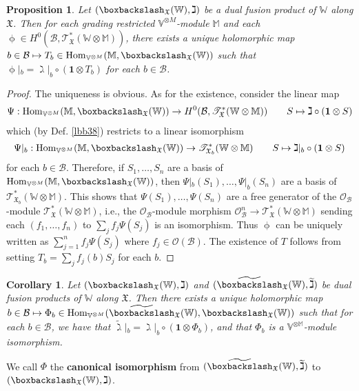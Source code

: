 \documentclass[11pt,b5paper,notitlepage]{article}
\theoremstyle{definition}
\theoremstyle{plain}
\newtheorem{pp}[df]{Proposition}
\newtheorem{co}[df]{Corollary}
\newcommand{\mc}{\mathcal}
\newcommand{\wtd}{\widetilde}
\newcommand{\idt}{\mathbf{1}}
\newcommand{\Hom}{\mathrm{Hom}}
\newcommand{\scr}{\mathscr}
\newcommand{\Vbb}{\mathbb V}
\newcommand{\Wbb}{\mathbb W}
\newcommand{\Mbb}{\mathbb M}
\newcommand{\<}{\left\langle}
\renewcommand{\>}{\right\rangle}
\newcommand{\MO}{\mathcal{O}}
\newcommand{\MB}{\mathcal{B}}
\newcommand{\fx}{\mathfrak{X}}
\newcommand{\bbs}{\boxbackslash}
\numberwithin{equation}{subsection}
\begin{document}
\begin{pp}\label{lbb39}
Let $(\bbs_\fx(\Wbb),\gimel)$ be a dual fusion product of $\Wbb$ along $\fx$. Then for each grading restricted $\Vbb^{\otimes M}$-module $\Mbb$ and each $\upphi\in H^0(\MB,\scr T_\fx^*(\Wbb\otimes\Mbb))$, there exists a unique holomorphic map $b\in\MB\mapsto T_b\in \Hom_{\Vbb^{\otimes M}}(\Mbb,\bbs_\fx(\Wbb))$ such that $\upphi|_b=\gimel|_b\circ(\idt\otimes T_b)$ for each $b\in\MB$.
\end{pp}


\begin{proof}
The uniqueness is obvious. As for the existence, consider the linear map
\begin{align*}
\Psi:\Hom_{\Vbb^{\otimes M}}(\Mbb,\bbs_\fx(\Wbb))\rightarrow H^0(\MB,\scr T_\fx^*(\Wbb\otimes\Mbb))\qquad S\mapsto \gimel\circ(\idt\otimes S)
\end{align*}
which (by Def. \ref{lbb38}) restricts to a linear isomorphism
\begin{align*}
\Psi|_b:\Hom_{\Vbb^{\otimes M}}(\Mbb,\bbs_\fx(\Wbb))\rightarrow \scr T_{\fx_b}^*(\Wbb\otimes\Mbb)\qquad S\mapsto\gimel|_b\circ(\idt\otimes S)
\end{align*}
for each $b\in\MB$. Therefore, if $S_1,\dots,S_n$ are a basis of $\Hom_{\Vbb^{\otimes M}}(\Mbb,\bbs_\fx(\Wbb))$, then $\Psi|_b(S_1),\dots,\Psi|_b(S_n)$ are a basis of $\scr T_{\fx_b}^*(\Wbb\otimes\Mbb)$. This shows that $\Psi(S_1),\dots,\Psi(S_n)$ are a free generator of the $\mc O_\MB$-module $\scr T_\fx^*(\Wbb\otimes\Mbb)$, i.e., the $\MO_\MB$-module morphism $\MO_\MB^n\rightarrow \scr T_\fx^*(\Wbb\otimes\Mbb)$ sending each $(f_1,\dots,f_n)$ to $\sum_j f_j\Psi(S_j)$ is an isomorphism. Thus $\upphi$ can be uniquely written as $\sum_{j=1}^n f_j\Psi(S_j)$ where $f_j\in\mc O(\MB)$. The existence of $T$ follows from setting $T_b=\sum_j f_j(b)S_j$ for each $b$.
\end{proof}


\begin{co}\label{lbb40}
Let $(\bbs_\fx(\Wbb),\gimel)$ and $(\wtd\bbs_\fx(\Wbb),\wtd\gimel)$ be dual fusion products of $\Wbb$ along $\fx$. Then there exists a unique holomorphic map $b\in\MB\mapsto \Phi_b\in\Hom_{\Vbb^{\otimes M}}(\wtd\bbs_\fx(\Wbb),\bbs_\fx(\Wbb))$ such that for each $b\in\MB$, we have that $\wtd\gimel|_b=\gimel|_b\circ(\idt\otimes \Phi_b)$, and that $\Phi_b$ is a $\Vbb^{\otimes\Mbb}$-module isomorphism.
\end{co}

We call $\Phi$ the \textbf{canonical isomorphism} from $(\wtd\bbs_\fx(\Wbb),\wtd\gimel)$ to $(\bbs_\fx(\Wbb),\gimel)$.
\end{document}
